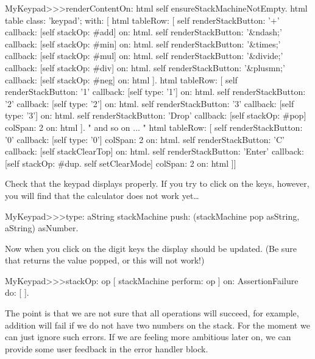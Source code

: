 \documentclass[a4paper,10pt,twoside]{book}
\begin{document}
\begin{code}{}
MyKeypad>>>renderContentOn: html 
  self ensureStackMachineNotEmpty.
  html table
    class: 'keypad';
    with: [
      html tableRow: [
          self renderStackButton: '+' callback: [self stackOp: #add] on: html.
          self renderStackButton: '&ndash;' callback: [self stackOp: #min] on: html.
          self renderStackButton: '&times;' callback: [self stackOp: #mul] on: html.
          self renderStackButton: '&divide;' callback: [self stackOp: #div] on: html.
          self renderStackButton: '&plusmn;' callback: [self stackOp: #neg] on: html ].
        html tableRow: [
          self renderStackButton: '1' callback: [self type: '1'] on: html.
          self renderStackButton: '2' callback: [self type: '2'] on: html.
          self renderStackButton: '3' callback: [self type: '3'] on: html.
          self renderStackButton: 'Drop' callback: [self stackOp: #pop]
          	colSpan: 2 on: html ].
" and so on ... "
        html tableRow: [
          self renderStackButton: '0' callback: [self type: '0'] colSpan: 2 on: html.
          self renderStackButton: 'C' callback: [self stackClearTop] on: html.
          self renderStackButton: 'Enter'
          	callback: [self stackOp: #dup. self setClearMode]
			colSpan: 2 on: html ]]
\end{code}

Check that the keypad displays properly.
If you try to click on the keys, however, you will find that the calculator does not work yet\ldots{}

\begin{code}{}
MyKeypad>>>type: aString
	stackMachine push: (stackMachine pop asString, aString) asNumber.
\end{code}
Now when you click on the digit keys the display should be updated.
(Be sure that  returns the value popped, or this will not work!)



\begin{code}{}
MyKeypad>>>stackOp: op
	[ stackMachine perform: op ] on: AssertionFailure do: [ ].
\end{code}

The point is that we are not sure that all operations will succeed, for example, addition will fail if we do not have two numbers on the stack.
For the moment we can just ignore such errors.
If we are feeling more ambitious later on, we can provide some user feedback in the error handler block.
\end{document}
